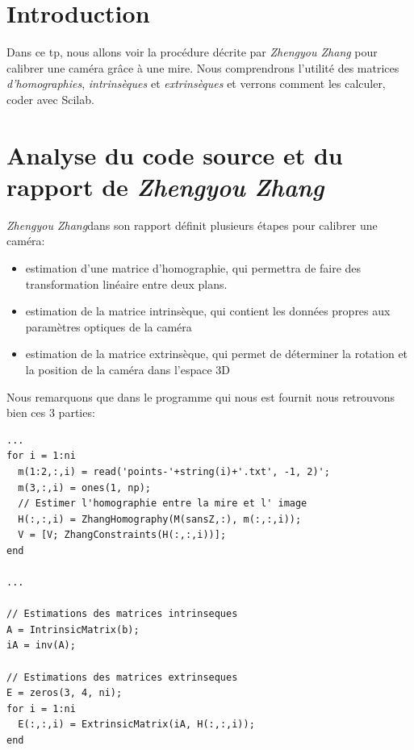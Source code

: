 \documentclass[a4paper,12pt]{report}
\begin{document}


\setcounter{page}{1} 
\newpage

\section*{Introduction}
Dans ce tp, nous allons voir la procédure décrite par \textit{Zhengyou Zhang} pour calibrer une caméra grâce à une mire. Nous comprendrons l'utilité des matrices \textit{d'homographies}, \textit{intrinsèques} et \textit{extrinsèques} et verrons comment les calculer, coder avec Scilab.

\section*{Analyse du code source et du rapport de \textit{Zhengyou Zhang} }


\textit{Zhengyou Zhang}dans son rapport définit plusieurs étapes pour calibrer une caméra:

\begin{itemize}
	\item estimation d'une matrice d'homographie, qui permettra de faire des transformation linéaire entre deux plans.
	\item estimation de la matrice intrinsèque, qui contient les données propres aux paramètres optiques de la caméra
	\item estimation de la matrice extrinsèque, qui permet de déterminer la rotation et la position de la caméra dans l'espace 3D
\end{itemize}

Nous remarquons que dans le programme qui nous est fournit nous retrouvons bien ces 3 parties:


\begin{lstlisting}[style=Scilab]
... 
for i = 1:ni                             
  m(1:2,:,i) = read('points-'+string(i)+'.txt', -1, 2)';
  m(3,:,i) = ones(1, np);
  // Estimer l'homographie entre la mire et l' image
  H(:,:,i) = ZhangHomography(M(sansZ,:), m(:,:,i));
  V = [V; ZhangConstraints(H(:,:,i))];
end

...

// Estimations des matrices intrinseques
A = IntrinsicMatrix(b);
iA = inv(A);

// Estimations des matrices extrinseques
E = zeros(3, 4, ni);
for i = 1:ni
  E(:,:,i) = ExtrinsicMatrix(iA, H(:,:,i));
end
\end{lstlisting}
\end{document}
